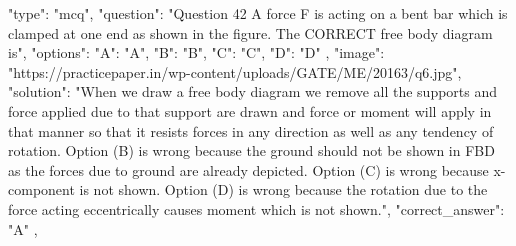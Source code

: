   {
    "type": "mcq",
    "question": "Question 42 A force F is acting on a bent bar which is clamped at one end as shown in the figure. The CORRECT free body diagram is",
    "options": {
      "A": "A",
      "B": "B",
      "C": "C",
      "D": "D"
    },
    "image": "https://practicepaper.in/wp-content/uploads/GATE/ME/20163/q6.jpg",
    "solution": "When we draw a free body diagram we remove all the supports and force applied due to that support are drawn and force or moment will apply in that manner so that it resists forces in any direction as well as any tendency of rotation. Option (B) is wrong because the ground should not be shown in FBD as the forces due to ground are already depicted. Option (C) is wrong because x-component is not shown. Option (D) is wrong because the rotation due to the force acting eccentrically causes moment which is not shown.",
    "correct_answer": "A"
  },
